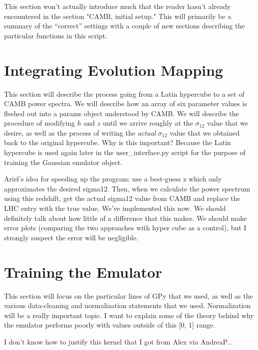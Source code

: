 This section won't actually introduce much that the reader hasn't already encountered in the section "CAMB, initial setup." This will primarily be a summary of the ``correct'' settings with a couple of new sections describing the particular functions in this script.

\section{Integrating Evolution Mapping}
\label{sec: generate_emu_data}


This section will describe the process going from a Latin hypercube to a set of CAMB power spectra. We will describe how an array of six parameter values is fleshed out into a params object understood by CAMB. We will describe the procedure of modifying $h$ and $z$ until we arrive roughly at the $\sigma_{12}$ value that we desire, as well as the process of writing the \textit{actual} $\sigma_{12}$ value that we obtained back to the original hypercube. Why is this important? Because the Latin hypercube is used again later in the user\_interface.py script for the purpose of training the Gaussian emulator object.

Ariel’s idea for speeding up the program: use a best-guess z which only approximates the desired sigma12. Then, when we calculate the power spectrum using this redshift, get the actual sigma12 value from CAMB and replace the LHC entry with the true value.
We’ve implemented this now. We should definitely talk about how little of a difference that this makes. We should make error plots (comparing the two approaches with hyper cube as a control), but I strongly suspect the error will be negligible.



\section{Training the Emulator}
\label{sec: train_emu}


This section will focus on the particular lines of GPy that we used, as well
as the various data-cleaning and normalization statements that we used.
Normalization will be a really important topic. I want to explain some of
the theory behind why the emulator performs poorly with values outside of this
[0, 1] range.

I don't know how to justify this kernel that I got from Alex via AndreaP...


